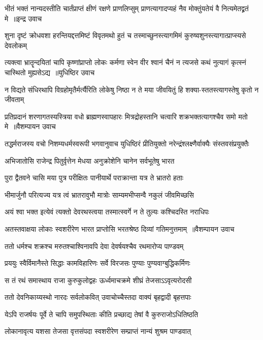 \threelineshloka
{भीतं भक्तं नान्यदस्तीति चार्तंप्राप्तं क्षीणं रक्षणे प्राणलिप्सुम्}
{प्राणत्यागादप्यहं नैव मोक्तुंयतेयं वै नित्यमेतद्व्रतं मे ॥इन्द्र उवाच}
{}


\twolineshloka
{शुना दृष्टं क्रोधवशा हरन्तियद्दत्तमिष्टं विवृतमथो हुतं च}
{तस्माच्छुनस्त्यागमिमं कुरुष्वशुनस्त्यागात्प्राप्स्यसे देवलोकम्}


\threelineshloka
{त्यक्त्वा भ्रातॄन्दयितां चापि कृष्णांप्राप्तो लोकः कर्मणा स्वेन वीर}
{श्वानं चैनं न त्यजसे कथं नुत्यागं कृत्स्नं चास्थितो मुह्यसेऽद्य ॥युधिष्ठिर उवाच}
{}


\twolineshloka
{न विद्यते संधिरथापि विग्रहोमृतैर्मर्त्यैरिति लोकेषु निष्ठा}
{न ते मया जीवयितुं हि शक्या-स्ततस्त्यागस्तेषु कृतो न जीवताम्}


\threelineshloka
{प्रतिप्रदानं शरणागतस्यस्त्रिया वधो ब्राह्मणस्वापहारः}
{मित्रद्रोहस्तानि चत्वारि शक्रभक्तत्यागश्चैव समो मतो मे ॥वैशम्पायन उवाच}
{}


\twolineshloka
{तद्धर्मराजस्य वचो निशम्यधर्मस्वरूपी भगवानुवाच}
{युधिष्ठिरं प्रीतियुक्तो नरेन्द्रंश्लक्ष्णैर्वाक्यैः संस्तवसंप्रयुक्तैः}


\twolineshloka
{अभिजातोसि राजेन्द्र पितुर्वृत्तेन मेधया}
{अनुक्रोशेनि चानेन सर्वभूतेषु भारत}


\twolineshloka
{पुरा द्वैतवने चासि मया पुत्र परीक्षितः}
{पानीयार्थे पराक्रान्ता यत्र ते भ्रातरो हताः}


\twolineshloka
{भीमार्जुनौ परित्यज्य यत्र त्वं भ्रातरावुभौ}
{मात्रोः साम्यमभीप्सन्वै नकुलं जीवमिच्छसि}


\twolineshloka
{अयं श्वा भक्त इत्येवं त्यक्तो देवरथस्त्वया}
{तस्मात्स्वर्गे न ते तुल्यः कश्चिदस्ति नराधिपः}


\threelineshloka
{अतस्तवाक्षया लोकाः स्वशरीरेण भारत}
{प्राप्तोसि भरतश्रेष्ठ दिव्यां गतिमनुत्तमाम् ॥वैशम्पायन उवाच}
{}


\twolineshloka
{ततो धर्मश्च शक्रश्च मरुतश्चाश्विनावपि}
{देवा देवर्षयश्चैव रथमारोप्य पाण्डवम्}


\twolineshloka
{प्रययुः स्वैर्विमानैस्ते सिद्धाः कामविहारिणः}
{सर्वे विरजसः पुण्याः पुण्यवाग्बुद्धिकर्मिणः}


\twolineshloka
{स तं रथं समास्थाय राजा कुरुकुलोद्वहः}
{ऊर्ध्वमाचक्रमे शीघ्रं तेजसाऽऽवृत्यरोदसी}


\twolineshloka
{ततो देवनिकाय्यस्थो नारदः सर्वलोकवित्}
{उवाचोच्चैस्तदा वाक्यं बृहद्वादी बृहत्तपाः}


\twolineshloka
{येऽपि राजर्षयः पूर्वे ते चापि समुपस्थिताः}
{कीति प्रच्छाद्य तेषां वै कुरुराजोऽधितिष्ठति}


\twolineshloka
{लोकानावृत्य यशसा तेजसा वृत्तसंपदा}
{स्वशरीरेण सम्प्राप्तं नान्यं शुश्रम पाण्डवात्}


